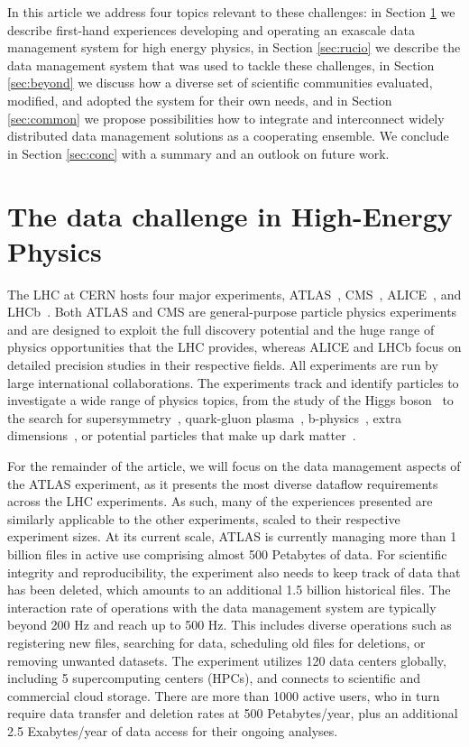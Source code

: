 \documentclass[11pt]{article}
\begin{document}
In this article we address four topics relevant to these challenges: in Section \ref{sec:hep} we describe first-hand experiences developing and operating an exascale data management system for high energy physics, in Section \ref{sec:rucio} we describe the data management system that was used to tackle these challenges, in Section \ref{sec:beyond} we discuss how a diverse set of scientific communities evaluated, modified, and adopted the system for their own needs, and in Section \ref{sec:common} we propose possibilities how to integrate and interconnect widely distributed data management solutions as a cooperating ensemble. We conclude in Section \ref{sec:conc} with a summary and an outlook on future work.

\section{The data challenge in High-Energy Physics}
\label{sec:hep}

The LHC at CERN hosts four major experiments, ATLAS~\cite{atlas}, CMS~\cite{cms}, ALICE~\cite{alice}, and LHCb~\cite{lhcb}. Both ATLAS and CMS are general-purpose particle physics experiments and are designed to exploit the full discovery potential and the huge range of physics opportunities that the LHC provides, whereas ALICE and LHCb focus on detailed precision studies in their respective fields. All experiments are run by large international collaborations. The experiments track and identify particles to investigate a wide range of physics topics, from the study of the Higgs boson~\cite{higgs} to the search for supersymmetry~\cite{susy}, quark-gluon plasma~\cite{plasma}, b-physics~\cite{beauty}, extra dimensions~\cite{extra}, or potential particles that make up dark matter~\cite{darkmatter}.

For the remainder of the article, we will focus on the data management aspects of the ATLAS experiment, as it presents the most diverse dataflow requirements across the LHC experiments. As such, many of the experiences presented are similarly applicable to the other experiments, scaled to their respective experiment sizes. At its current scale, ATLAS is currently managing more than 1 billion files in active use comprising almost 500 Petabytes of data. For scientific integrity and reproducibility, the experiment also needs to keep track of data that has been deleted, which amounts to an additional 1.5 billion historical files. The interaction rate of operations with the data management system are typically beyond 200 Hz and reach up to 500 Hz. This includes diverse operations such as registering new files, searching for data, scheduling old files for deletions, or removing unwanted datasets. The experiment utilizes 120 data centers globally, including 5 supercomputing centers (HPCs), and connects to scientific and commercial cloud storage. There are more than 1000 active users, who in turn require data transfer and deletion rates at 500 Petabytes/year, plus an additional 2.5 Exabytes/year of data access for their ongoing analyses.
\end{document}
